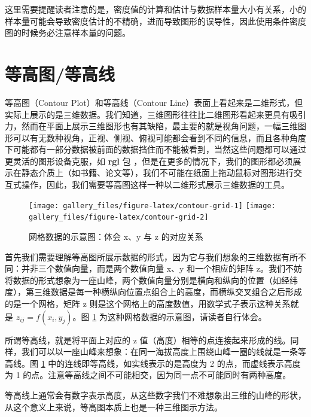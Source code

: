 \documentclass[
  b5paper,
  UTF8,twoside]{book}
\begin{document}
这里需要提醒读者注意的是，密度值的计算和估计与数据样本量大小有关系，小的样本量可能会导致密度估计的不精确，进而导致图形的误导性，因此使用条件密度图的时候务必注意样本量的问题。

\section{等高图/等高线}\label{sec:contour}

等高图（Contour Plot）和等高线（Contour
Line）表面上看起来是二维形式，但实际上展示的是三维数据。我们知道，三维图形往往比二维图形看起来更具有吸引力，然而在平面上展示三维图形也有其缺陷，最主要的就是视角问题，一幅三维图形可以有无数种视角，正视、侧视、俯视可能都会看到不同的信息，而且各种角度下可能都有一部分数据被前面的数据挡住而不能被看到，当然这些问题都可以通过更灵活的图形设备克服，如 \textbf{rgl} 包 \citep{rgl}，但是在更多的情况下，我们的图形都必须展示在静态介质上（如书籍、论文等），我们不可能在纸面上拖动鼠标对图形进行交互式操作，因此，我们需要等高图这样一种以二维形式展示三维数据的工具。





\begin{figure}

{\centering \texttt{[image: gallery\_files/figure-latex/contour-grid-1]} \texttt{[image: gallery\_files/figure-latex/contour-grid-2]} 

}

\caption[网格数据的示意图]{网格数据的示意图：体会 x、y 与 z 的对应关系}\label{fig:contour-grid}
\end{figure}

首先我们需要理解等高图所展示数据的形式，因为它与我们想象的三维数据有所不同：并非三个数值向量，而是两个数值向量 x、y 和一个相应的矩阵 z。我们不妨将数据的形式想象为一座山峰，两个数值向量分别是横向和纵向的位置（如经纬度），第三维数据是每一种横纵向位置点组合上的高度，而横纵交叉组合之后形成的是一个网格，矩阵 z 则是这个网格上的高度数值，用数学式子表示这种关系就是 \(z_{ij}=f(x_{i},y_{j})\)。图 \ref{fig:contour-grid} 为这种网格数据的示意图，请读者自行体会。

所谓等高线，就是将平面上对应的 z 值（高度）相等的点连接起来形成的线。同样，我们可以以一座山峰来想象：在同一海拔高度上围绕山峰一圈的线就是一条等高线。图 \ref{fig:contour-grid}
中的连线即等高线，如实线表示的是高度为 2 的点，而虚线表示高度为 1 的点。注意等高线之间不可能相交，因为同一点不可能同时有两种高度。

等高线上通常会有数字表示高度，从这些数字我们不难想象出三维的山峰的形状，从这个意义上来说，等高图本质上也是一种三维图示方法。
\end{document}
